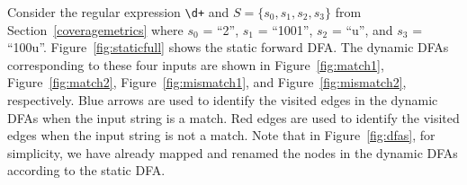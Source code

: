 Consider the regular expression \verb!\d+! and $S = \{s_0, s_1, s_2, s_3\}$ from Section~\ref{coveragemetrics} where $s_0$ = ``2'', $s_1$ = ``1001'', $s_2$ = ``u'', and $s_3$ = ``100u''. Figure~\ref{fig:staticfull} shows the static forward DFA. %
The dynamic DFAs corresponding to these four inputs are shown in Figure~\ref{fig:match1}, Figure~\ref{fig:match2}, Figure~\ref{fig:mismatch1}, and Figure~\ref{fig:mismatch2}, respectively. Blue arrows are used to identify the visited edges in the dynamic DFAs when the input string is a match. Red edges are used to identify the visited edges when the input string is not a match. 
Note that in Figure~\ref{fig:dfas}, for simplicity, we have already mapped and renamed the nodes in the dynamic DFAs according to the static DFA. %





